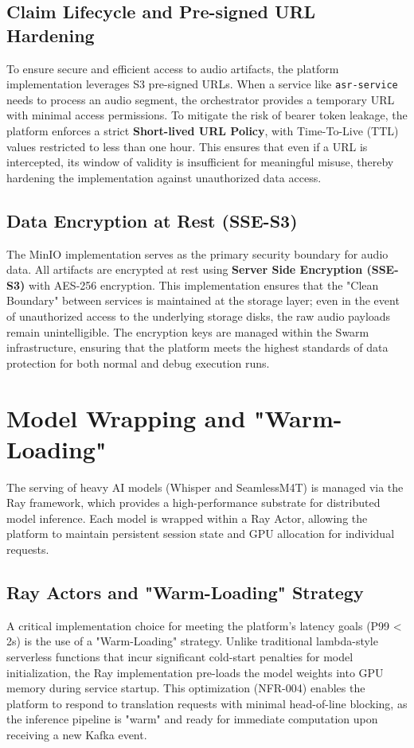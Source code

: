 \subsection{Claim Lifecycle and Pre-signed URL Hardening}
To ensure secure and efficient access to audio artifacts, the platform implementation leverages S3 pre-signed URLs. When a service like \texttt{asr-service} needs to process an audio segment, the orchestrator provides a temporary URL with minimal access permissions. To mitigate the risk of bearer token leakage, the platform enforces a strict \textbf{Short-lived URL Policy}, with Time-To-Live (TTL) values restricted to less than one hour. This ensures that even if a URL is intercepted, its window of validity is insufficient for meaningful misuse, thereby hardening the implementation against unauthorized data access.

\subsection{Data Encryption at Rest (SSE-S3)}
The MinIO implementation serves as the primary security boundary for audio data. All artifacts are encrypted at rest using \textbf{Server Side Encryption (SSE-S3)} with AES-256 encryption. This implementation ensures that the "Clean Boundary" between services is maintained at the storage layer; even in the event of unauthorized access to the underlying storage disks, the raw audio payloads remain unintelligible. The encryption keys are managed within the Swarm infrastructure, ensuring that the platform meets the highest standards of data protection for both normal and debug execution runs.

\section{Model Wrapping and "Warm-Loading"}
\label{sec:impl_model_wrapping}

The serving of heavy AI models (Whisper and SeamlessM4T) is managed via the Ray framework, which provides a high-performance substrate for distributed model inference. Each model is wrapped within a Ray Actor, allowing the platform to maintain persistent session state and GPU allocation for individual requests.

\subsection{Ray Actors and "Warm-Loading" Strategy}
A critical implementation choice for meeting the platform's latency goals (P99 < 2s) is the use of a "Warm-Loading" strategy. Unlike traditional lambda-style serverless functions that incur significant cold-start penalties for model initialization, the Ray implementation pre-loads the model weights into GPU memory during service startup. This optimization (NFR-004) enables the platform to respond to translation requests with minimal head-of-line blocking, as the inference pipeline is "warm" and ready for immediate computation upon receiving a new Kafka event.

